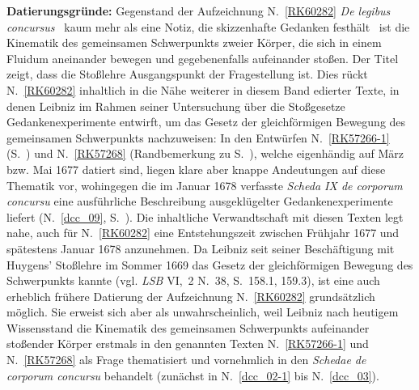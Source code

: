 \begin{ledgroup}
\footnotesize
\pstart
\noindent%
\textbf{Datierungsgründe:}%
\label{LH_37_05_024_Datierung}
Gegenstand der Aufzeichnung N.~\ref{RK60282} %
\textit{De legibus concursus} \textendash\ kaum mehr als eine Notiz, die skizzenhafte Gedanken festhält \textendash\ ist die Kinematik des gemeinsamen Schwerpunkts zweier Körper, die sich in einem Fluidum aneinander bewegen und gegebenenfalls aufeinander stoßen.
Der Titel zeigt, dass die Stoßlehre Ausgangspunkt der Fragestellung ist.
Dies rückt N.~\ref{RK60282} %
inhaltlich in die Nähe weiterer in diesem Band edierter Texte, in denen Leibniz im Rahmen seiner Untersuchung über die Stoßgesetze Gedankenexperimente entwirft, um das Gesetz der gleichförmigen Bewegung des gemeinsamen Schwerpunkts nachzuweisen:
In den Entwürfen N.~\ref{RK57266-1} %
(S.~) und N.~\ref{RK57268} %
(Randbemerkung zu S.~), welche eigenhändig auf März bzw. Mai 1677 datiert sind,
liegen klare aber knappe Andeutungen auf diese Thematik vor, wohingegen die im Januar 1678 verfasste \textit{Scheda IX de corporum concursu} eine ausführliche Beschreibung ausgeklügelter Gedankenexperimente liefert (N.~\ref{dcc_09}, %
S.~).
Die inhaltliche Verwandtschaft mit diesen Texten legt nahe, auch für N.~\ref{RK60282} %
eine Entstehungszeit zwischen Frühjahr 1677 und spätestens Januar 1678 anzunehmen.
\pend%
%
\pstart%
Da Leibniz seit seiner Beschäftigung mit Huygens' Stoßlehre im Sommer 1669 das Gesetz der gleichförmigen Bewegung des Schwerpunkts kannte (vgl. \textit{LSB} VI,~2 N.~38,\cite{02025} S.~158.1, 159.3), ist eine auch erheblich frühere Datierung der Aufzeichnung N.~\ref{RK60282} %
grundsätzlich möglich.
Sie erweist sich aber als unwahrscheinlich, weil Leibniz nach heutigem Wissensstand die Kinematik des gemeinsamen Schwerpunkts aufeinander stoßender Körper erstmals in den genannten Texten N.~\ref{RK57266-1} %
und N.~\ref{RK57268} %
als Frage thematisiert und vornehmlich in den \textit{Schedae de corporum concursu} behandelt (zunächst in N.~\ref{dcc_02-1} %
bis N.~\ref{dcc_03}). %

\end{ledgroup}
